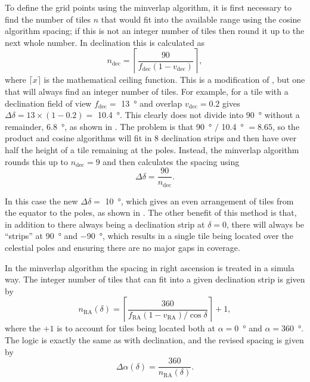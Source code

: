 \begin{colsection}
\begin{colsection}
\clearpage

To define the grid points using the minverlap algorithm, it is first necessary to find the number of tiles $n$ that would fit into the available range using the cosine algorithm spacing; if this is not an integer number of tiles then round it up to the next whole number. In declination this is calculated as
%
\begin{equation}
    n_\text{dec} = \left \lceil \frac{90}{f_\text{dec}(1-v_\text{dec})} \right \rceil,
    \label{eq:minverlap_ndec}
\end{equation}
%
where $\lceil x \rceil$ is the mathematical ceiling function. This is a modification of , but one that will always find an integer number of tiles. For example, for a tile with a declination field of view $f_\text{dec} = $ \SI{13}{\degree} and overlap $v_\text{dec} = 0.2$  gives $\Delta\delta = 13 \times (1-0.2) = $ \SI{10.4}{\degree}. This clearly does not divide into \SI{90}{\degree} without a remainder, \SI{6.8}{\degree}, as shown in . The problem is that \SI{90}{\degree} $/$ \SI{10.4}{\degree} $= 8.65$, so the product and cosine algorithms will fit in 8 declination strips and then have over half the height of a tile remaining at the poles. Instead, the minverlap algorithm rounds this up to $n_\text{dec} = 9$ and then calculates the spacing using
%
\begin{equation}
    \Delta\delta = \frac{90}{n_\text{dec}}.
    \label{eq:minverlap_deltadelta}
\end{equation}

In this case the new $\Delta\delta = $ \SI{10}{\degree}, which gives an even arrangement of tiles from the equator to the poles, as shown in . The other benefit of this method is that, in addition to there always being a declination strip at $\delta=0$, there will always be ``strips'' at \SI{+90}{\degree} and \SI{-90}{\degree}, which results in a single tile being located over the celestial poles and ensuring there are no major gaps in coverage.

In the minverlap algorithm the spacing in right ascension is treated in a simula way. The integer number of tiles that can fit into a given declination strip is given by
%
\begin{equation}
    n_\text{RA}(\delta) = \left \lceil \frac{360}{f_\text{RA}(1-v_\text{RA})/\cos \delta} \right \rceil + 1,
    \label{eq:minverlap_nra}
\end{equation}
%
where the $+1$ is  to account for tiles being located both at $\alpha=$\SI{0}{\degree} and $\alpha=$\SI{360}{\degree}. The logic is exactly the same as with declination, and the revised spacing is given by
%
\begin{equation}
    \Delta\alpha(\delta) = \frac{360}{n_\text{RA}(\delta)}.
    \label{eq:minverlap_deltaalpha}
\end{equation}


\end{colsection}
\end{colsection}
